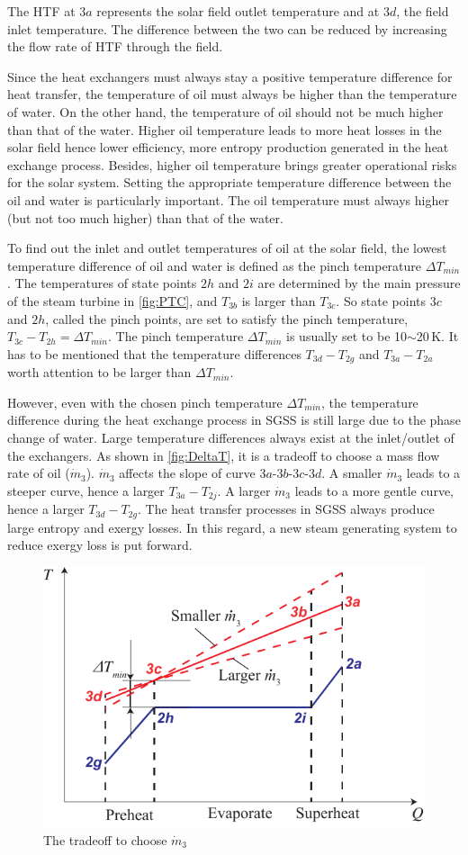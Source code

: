 The HTF at $3a$ represents the solar field outlet temperature and at $3d$, the field inlet temperature. The difference between the two can be reduced by increasing the flow rate of HTF through the field.

Since the heat exchangers must always stay a positive temperature difference for heat transfer, the temperature of oil must always be higher than the temperature of water. On the other hand, the temperature of oil should not be much higher than that of the water. Higher oil temperature leads to more heat losses in the solar field hence lower efficiency, more entropy production generated in the heat exchange process. Besides, higher oil temperature brings greater operational risks for the solar system. Setting the appropriate temperature difference between the oil and water is particularly important. The oil temperature must always higher (but not too much higher) than that of the water.

To find out the inlet and outlet temperatures of oil at the solar field, the lowest temperature difference of oil and water is defined as the pinch temperature $\Delta T_{min}$. The temperatures of state points $2h$ and $2i$ are determined by the main pressure of the steam turbine in \autoref{fig:PTC}, and $T_{3b}$ is larger than $T_{3c}$. So state points $3c$ and $2h$, called the pinch points, are set to satisfy the pinch temperature, $T_{3c} - T_{2h} = \Delta T_{min}$. The pinch temperature $\Delta T_{min}$ is usually set to be 10$\sim$20$\,\mathrm{K}$.
It has to be mentioned that the temperature differences $T_{3d} - T_{2g}$ and $T_{3a} - T_{2a}$ worth attention to be larger than $\Delta T_{min}$.

However, even with the chosen pinch temperature $\Delta T_{min}$, the temperature difference during the heat exchange process in SGSS is still large due to the phase change of water. Large temperature differences always exist at the inlet/outlet of the exchangers. As shown in \autoref{fig:DeltaT}, it is a tradeoff to choose a mass flow rate of oil ($\dot{m}_3$). $\dot{m}_3$ affects the slope of curve $3a$-$3b$-$3c$-$3d$. A smaller $\dot{m}_3$ leads to a steeper curve, hence a larger $T_{3a} - T_{2j}$. A larger $\dot{m}_3$ leads to a more gentle curve, hence a larger $T_{3d} - T_{2g}$. The heat transfer processes in SGSS always produce large entropy and exergy losses. In this regard, a new steam generating system to reduce exergy loss is put forward.

\begin{figure}[htbp]
\centering
	\includegraphics[width = 0.5\columnwidth]{fig/DeltaT}
	\caption{The tradeoff to choose $\dot{m}_3$}
	\label{fig:DeltaT}
\end{figure}

